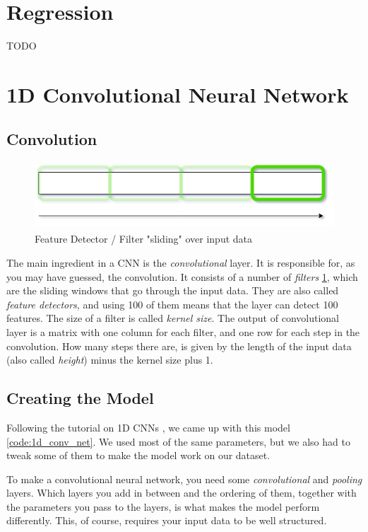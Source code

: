 \section{Regression}

TODO

\section{1D Convolutional Neural Network}

\subsection{Convolution}
\begin{figure}
    \includegraphics[height=2.5cm]{img/feature_detector.png}
    \caption{Feature Detector / Filter "sliding" over input data}
    \label{figure:feature_detector}
\end{figure}

The main ingredient in a CNN is the \textit{convolutional} layer. It is responsible for, as you may have guessed, the convolution.
It consists of a number of \textit{filters} \ref{figure:feature_detector}, which are the sliding windows that go through the input data. 
They are also called \textit{feature detectors}, and using 100 of them means that the layer can detect 100 features. 
The size of a filter is called \textit{kernel size}. The output of convolutional layer is a matrix with one column for each filter, and one row for each step
in the convolution. How many steps there are, is given by the length of the input data (also called \textit{height}) minus the kernel size plus 1.


\subsection{Creating the Model}
Following the tutorial on 1D CNNs \cite{1d_cnn}, we came up with this model \ref{code:1d_conv_net}. 
We used most of the same parameters, but we also had to tweak some of them to make the model work on our dataset.

To make a convolutional neural network, you need some \textit{convolutional} and \textit{pooling} layers.
Which layers you add in between and the ordering of them, together with the parameters you pass to the layers, 
is what makes the model perform differently. This, of course, requires your input data to be well structured.

